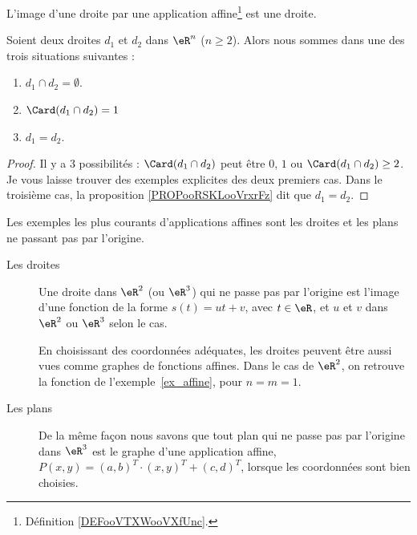 \begin{proposition}     \label{PROPooNTHVooWWyafJ}
	L'image d'une droite par une application affine\footnote{Définition \ref{DEFooVTXWooVXfUnc}.} est une droite.
\end{proposition}


\begin{proposition}     \label{PROPooTFTJooJejuBU}
	Soient deux droites \( d_1\) et \( d_2\) dans \( \eR^n\) (\( n\geq 2\)). Alors nous sommes dans une des trois situations suivantes :
	\begin{enumerate}
		\item
		      \( d_1\cap d_2=\emptyset\).
		\item
		      \( \Card(d_1\cap d_2)=1\)
		\item
		      \( d_1=d_2\).
	\end{enumerate}
\end{proposition}

\begin{proof}
	Il y a \( 3\) possibilités : \( \Card(d_1\cap d_2)\) peut être \( 0\), \( 1\) ou \( \Card(d_1\cap d_2)\geq 2\). Je vous laisse trouver des exemples explicites des deux premiers cas. Dans le troisième cas, la proposition \ref{PROPooRSKLooVrxrFz} dit que \( d_1=d_2\).
\end{proof}

\begin{example}
	Les exemples les plus courants d'applications affines sont les droites et les plans ne passant pas par l'origine.
	\begin{description}
		\item[Les droites] Une droite dans \( \eR^2\) (ou \( \eR^3\)) qui ne passe pas par l'origine est l'image d'une fonction de la forme \( s(t) =u t +v\), avec \( t \in \eR\), et \( u\) et \( v\) dans \( \eR^2\) ou \( \eR^3\) selon le cas.

		      En choisissant des coordonnées adéquates, les droites peuvent être aussi vues comme graphes de fonctions affines. Dans le cas de \( \eR^2\), on retrouve la fonction de l'exemple~\ref{ex_affine}, pour \( n = m = 1 \).

		\item[Les plans]
		      De la même façon nous savons que tout plan qui ne passe pas par l'origine dans \( \eR^3\) est le graphe d'une application affine, \( P(x,y)= (a,b)^T\cdot(x,y)^T+(c,d)^T\), lorsque les coordonnées sont bien choisies.
	\end{description}
\end{example}


